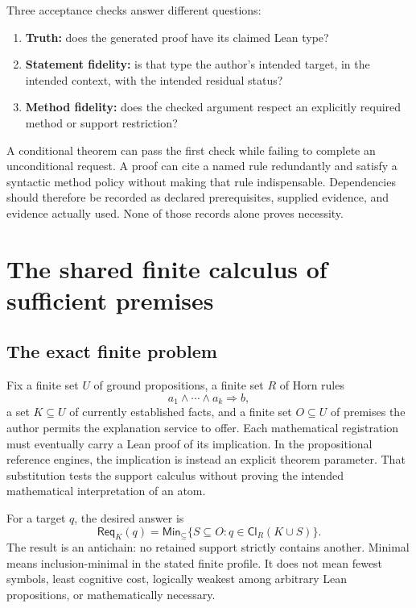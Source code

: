 \documentclass[11pt,letterpaper]{article}
\newcommand{\Req}{\mathsf{Req}}\newcommand{\Cl}{\mathsf{Cl}}
\newcommand{\Min}{\mathsf{Min}}\newcommand{\obs}{\mathsf{obs}}
\theoremstyle{definition}\newtheorem{definition}[proposition]{Definition}
\theoremstyle{remark}\newtheorem{remark}[proposition]{Remark}
\begin{document}
Three acceptance checks answer different questions:
\begin{enumerate}
\item \textbf{Truth:} does the generated proof have its claimed Lean type?
\item \textbf{Statement fidelity:} is that type the author's intended target,
in the intended context, with the intended residual status?
\item \textbf{Method fidelity:} does the checked argument respect an explicitly
required method or support restriction?
\end{enumerate}
A conditional theorem can pass the first check while failing to complete an
unconditional request. A proof can cite a named rule redundantly and satisfy
a syntactic method policy without making that rule indispensable. Dependencies
should therefore be recorded as declared prerequisites, supplied evidence,
and evidence actually used. None of those records alone proves necessity.

\section{The shared finite calculus of sufficient premises}
\label{sec:antichains}

\subsection{The exact finite problem}

Fix a finite set $U$ of ground propositions, a finite set $R$ of Horn rules
\[
 a_1\land\cdots\land a_k\Longrightarrow b,
\]
a set $K\subseteq U$ of currently established facts, and a finite set
$O\subseteq U$ of premises the author permits the explanation service to
offer. Each mathematical registration must eventually carry a Lean proof
of its implication. In the propositional reference engines, the implication
is instead an explicit theorem parameter. That substitution tests the support
calculus without proving the intended mathematical interpretation of an atom.

For a target $q$, the desired answer is
\begin{equation}\label{eq:req}
 \Req_K(q)=\Min_{\subseteq}\{S\subseteq O:q\in\Cl_R(K\cup S)\}.
\end{equation}
The result is an antichain: no retained support strictly contains another.
Minimal means inclusion-minimal in the stated finite profile. It does not mean
fewest symbols, least cognitive cost, logically weakest among arbitrary Lean
propositions, or mathematically necessary.
\end{document}
